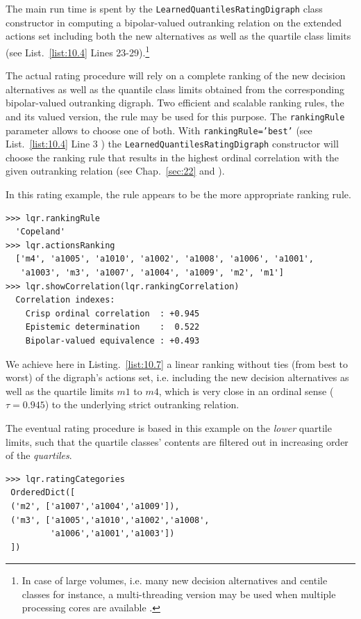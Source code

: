 The main run time is spent by the \texttt{LearnedQuantilesRatingDigraph} class constructor in computing a bipolar-valued outranking relation on the extended actions set including both the new alternatives as well as the quartile class limits (see List.~\vref{list:10.4} Lines 23-29).\footnote{In case of large volumes, i.e. many new decision alternatives and centile classes for instance, a multi-threading version may be used when multiple processing cores are available \citep{BIS-2021b}.}

The actual rating procedure will rely on a complete ranking of the new decision alternatives as well as the quantile class limits obtained from the corresponding bipolar-valued outranking digraph. Two efficient and scalable ranking rules, the \Copeland and its valued version, the \NetFlows rule may be used for this purpose. The \texttt{rankingRule} parameter allows to choose one of both. With \texttt{rankingRule='best'} (see List.~\vref{list:10.4} Line 3 ) the \texttt{LearnedQuantiles\-RatingDigraph} constructor will choose the ranking rule that results in the highest ordinal correlation with the given outranking relation (see Chap.~\ref{sec:22} and \citep{BIS-2012a}).

In this rating example, the \Copeland rule appears to be the more appropriate ranking rule.
\begin{lstlisting}[caption={\Copeland ranking of new alternatives and historical quartile limits},label=list:10.7]
>>> lqr.rankingRule
  'Copeland'
>>> lqr.actionsRanking
  ['m4', 'a1005', 'a1010', 'a1002', 'a1008', 'a1006', 'a1001',
   'a1003', 'm3', 'a1007', 'a1004', 'a1009', 'm2', 'm1'] 
>>> lqr.showCorrelation(lqr.rankingCorrelation)
  Correlation indexes:
    Crisp ordinal correlation  : +0.945
    Epistemic determination    :  0.522
    Bipolar-valued equivalence : +0.493
\end{lstlisting}

We achieve here in Listing.~\vref{list:10.7} a linear ranking without ties (from best to worst) of the digraph's actions set, i.e. including the new decision alternatives as well as the quartile limits $m1$ to $m4$, which is very close in an ordinal sense ($\tau = 0.945$) to the underlying strict outranking relation.

The eventual rating procedure is based in this example on the \emph{lower} quartile limits, such that the quartile classes' contents are filtered out in increasing order of the \emph{quartiles}.
\begin{lstlisting}
>>> lqr.ratingCategories
 OrderedDict([
 ('m2', ['a1007','a1004','a1009']),
 ('m3', ['a1005','a1010','a1002','a1008',
         'a1006','a1001','a1003'])
 ])
\end{lstlisting}    

